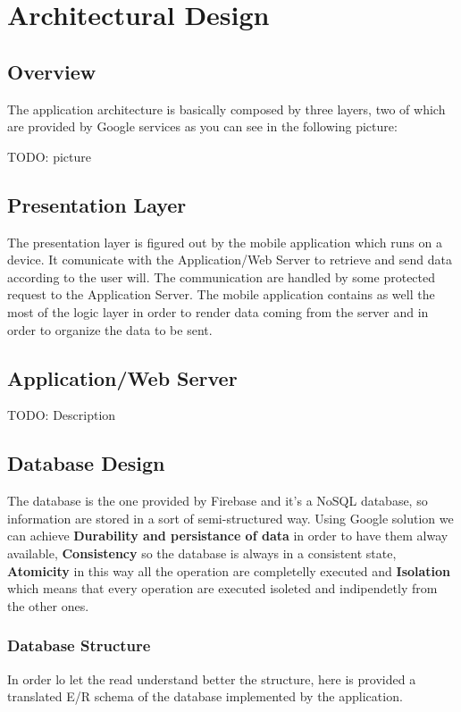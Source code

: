 \chapter{Architectural Design}

\section{Overview}
	The application architecture is basically composed by three layers, two of which are provided by Google services as you can see in the following picture:

	TODO: picture

\section{Presentation Layer}
	The presentation layer is figured out by the mobile application which runs on a device. 
	It comunicate with the Application/Web Server to retrieve and send data according to the user will. 
	The communication are handled by some protected request to the Application Server. 
	The mobile application contains as well the most of the logic layer in order to render data coming from the server and in order to organize the data to be sent.

\section{Application/Web Server}

	TODO: Description

\section{Database Design}
	The database is the one provided by Firebase and it's a NoSQL database, so information are stored in a sort of semi-structured way.
	Using Google solution we can achieve \textbf{Durability and persistance of data} in order to have them alway available, 
	\textbf{Consistency} so the database is always in a consistent state, \textbf{Atomicity} in this way all the operation are completelly executed and 
	\textbf{Isolation} which means that every operation are executed isoleted and indipendetly from the other ones.
	
	\subsection{Database Structure}
	In order lo let the read understand better the structure, here is provided a translated E/R schema of the database implemented by the application.
	
